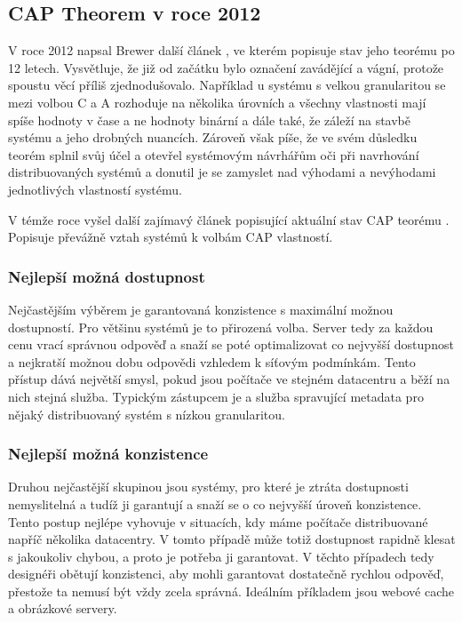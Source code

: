 \subsection{CAP Theorem v roce 2012}
V roce 2012 napsal Brewer další článek \cite{cap2}, ve kterém popisuje stav jeho teorému po 12 letech. Vysvětluje, že již od začátku bylo označení  zavádějící a vágní, protože spoustu věcí příliš zjednodušovalo. Například u systému s velkou granularitou se mezi volbou C a A rozhoduje na několika úrovních a všechny vlastnosti mají spíše hodnoty v čase a ne hodnoty binární a dále také, že záleží na stavbě systému a jeho drobných nuancích. Zároveň však píše, že ve svém důsledku teorém splnil svůj účel a otevřel systémovým návrhářům oči při navrhování distribuovaných systémů a donutil je se zamyslet nad výhodami a nevýhodami jednotlivých vlastností systému. 

V témže roce vyšel další zajímavý článek popisující aktuální stav CAP teorému \cite{cap3}. Popisuje převážně vztah
systémů k volbám CAP vlastností. 

\subsubsection{Nejlepší možná dostupnost}
Nejčastějším výběrem je garantovaná konzistence s maximální možnou dostupností. Pro většinu systémů je to přirozená volba. Server tedy  za každou cenu vrací správnou odpověď a snaží se poté optimalizovat co nejvyšší dostupnost a nejkratší možnou dobu odpovědi vzhledem k síťovým podmínkám. Tento přístup dává největší smysl, pokud jsou počítače ve stejném datacentru a běží na nich stejná služba. Typickým zástupcem je  a služba spravující metadata pro nějaký distribuovaný systém s nízkou granularitou.

\subsubsection{Nejlepší možná konzistence} 
Druhou nejčastější skupinou jsou systémy, pro které je ztráta dostupnosti nemyslitelná a tudíž ji garantují a snaží se o co nejvyšší úroveň konzistence. Tento postup nejlépe vyhovuje v situacích, kdy máme počítače distribuované napříč několika datacentry. V tomto případě může totiž dostupnost rapidně klesat s jakoukoliv chybou, a proto je potřeba ji garantovat. V těchto případech tedy designéři obětují konzistenci, aby mohli garantovat dostatečně rychlou odpověď, přestože ta nemusí být vždy zcela správná. Ideálním příkladem jsou webové cache a obrázkové servery.

